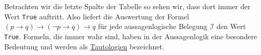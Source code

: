 \begin{table}[!ht]
  \centering
{}
  \caption{Berechnung der Wahrheitswerte von $(p \rightarrow q) \rightarrow (\neg p \rightarrow q) \rightarrow q$}
  \label{tab:tautologie}
\end{table}

Betrachten wir die letzte Spalte der Tabelle so sehen wir, dass dort immer der Wert
\texttt{True} auftritt.  Also liefert die Auswertung der Formel
$(p \rightarrow q) \rightarrow (\neg p \rightarrow q) \rightarrow q $
für jede aussagenlogische Belegung $\mathcal{I}$ den Wert \texttt{True}.  
Formeln, die immer wahr sind, haben in der Aussagenlogik eine besondere Bedeutung und
werden als \href{https://en.wikipedia.org/wiki/Tautology_(logic)}{Tautologien} bezeichnet.

